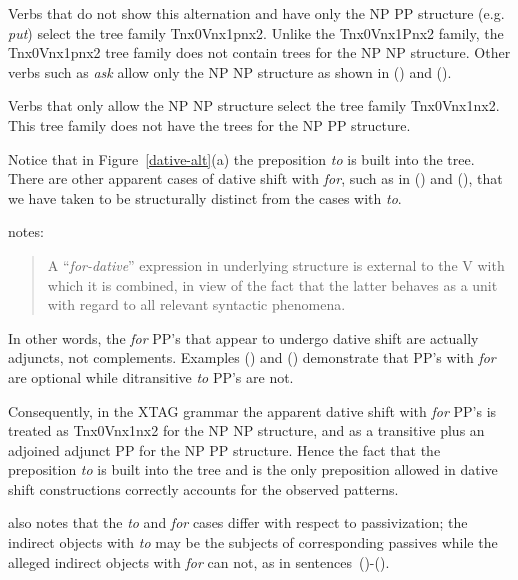 Verbs that do not show this alternation and have only the NP PP structure
(e.g. {\it put\/}) select the tree family Tnx0Vnx1pnx2.  Unlike the
Tnx0Vnx1Pnx2 family, the Tnx0Vnx1pnx2 tree family does not contain trees for
the NP NP structure. Other verbs such as {\it ask} allow only the NP NP
structure as shown in () and ().


Verbs that only allow the NP NP structure select the tree family
Tnx0Vnx1nx2. This tree family does not have the trees for the NP PP
structure. 

Notice that in Figure~\ref{dative-alt}(a) the preposition {\it to\/} is
built into the tree.  There are other apparent cases of dative shift
with {\it for}, such as in () and (), that we have taken to
be structurally distinct from the cases with {\it to}.  


\cite{mccawley88} notes:

\begin{quote}
A ``{\it for-dative}'' expression in underlying structure is external
to the V with which it is combined, in view of the fact that the
latter behaves as a unit with regard to all relevant syntactic
phenomena.
\end{quote}


In other words, the {\it for} PP's that appear to undergo dative shift are
actually adjuncts, not complements. Examples () and () demonstrate
that PP's with {\it for} are optional while ditransitive {\it to} PP's are not.


Consequently, in the XTAG grammar the apparent dative shift with {\it
for} PP's is treated as Tnx0Vnx1nx2 for the NP NP structure, and as a
transitive plus an adjoined adjunct PP for the NP PP structure.  Hence
the fact that the preposition {\it to} is built into the tree and is
the only preposition allowed in dative shift constructions correctly
accounts for the observed patterns.

\cite{mccawley88} also notes that the {\it to} and {\it for} cases
differ with respect to passivization; the indirect objects with {\it
to} may be the subjects of corresponding passives while the alleged
indirect objects with {\it for} can not, as in sentences~()-().

